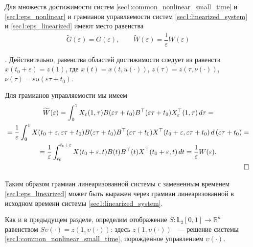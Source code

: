 \documentclass[../main.tex]{subfiles}
\begin{document}
\begin{utv}\label{sec1:utv:connection_with_scaled_system}
    {\textit Для множеств достижимости систем \eqref{sec1:common_nonlinear_small_time} и \eqref{sec1:eps_nonlinear} и грамианов управляемости систем \eqref{sec1:linearized_system} и \eqref{sec1:eps_linearized} имеют место равенства}
    \begin{gather*}
        \widetilde{G}(\varepsilon)=G(\varepsilon),  \qquad
        \widetilde{W}(\varepsilon) = \dfrac{1}{\varepsilon} W(\varepsilon)
    \end{gather*}
\end{utv}

\doc. 
Действительно, равенства областей достижимости следует из равенств $ x(t_0 + \varepsilon) = z(1) $, где $ x(t) = x(t,u(\cdot)) $, $ z(\tau) = z(\tau,\nu(\cdot))  $, $ \nu(\tau) = \varepsilon u(\varepsilon \tau + t_0)  $.

Для грамианов управляемости мы имеем
\begin{gather*}
\begin{gathered}
    \widetilde{W}(\varepsilon) =
        \int_0^1
        X_{ \varepsilon} (1,\tau)
        B(\varepsilon \tau + t_0)
        B^{\top}(\varepsilon \tau + t_0)
        X_{ \varepsilon}^{\top} (1,\tau) \, d\tau = \\
        = \dfrac{1}{\varepsilon}\int_0^1
        X(t_0+\varepsilon,\varepsilon \tau + t_0)
        B(\varepsilon \tau + t_0)
        B^{\top}(\varepsilon \tau + t_0)
        X^{\top}(t_0+\varepsilon,\varepsilon \tau + t_0) \,
        d\left( \varepsilon\tau + t_0\right) = \\ =
        \dfrac{1}{\varepsilon} \int_{t_0}^{t_0+\varepsilon}
        X(t_0+\varepsilon,t)
        B(t)
        B^{\top}(t)
        X^{\top}(t_0+\varepsilon,t) \, dt = \dfrac{1}{\varepsilon} W(\varepsilon). \\ \hfill \square
\end{gathered}
\end{gather*}

Таким образом грамиан линеаризованной системы с замененным временем \eqref{sec1:eps_linearized} может быть выражен через грамиан линеаризованной в исходном времени системы \eqref{sec1:linearized_system}.
        
Как и в предыдущем разделе, определим отображение $S: \mathbb{L}_2[0,1] \rightarrow \mathbb{R}^n $ равенством $S\upsilon(\cdot) = z(1,\upsilon(\cdot))$: здесь $ z(1,\upsilon(\cdot))$ ~--- решение системы \eqref{sec1:common_nonlinear_small_time}, порожденное управлением $\upsilon(\cdot)$. 
 
\end{document}
